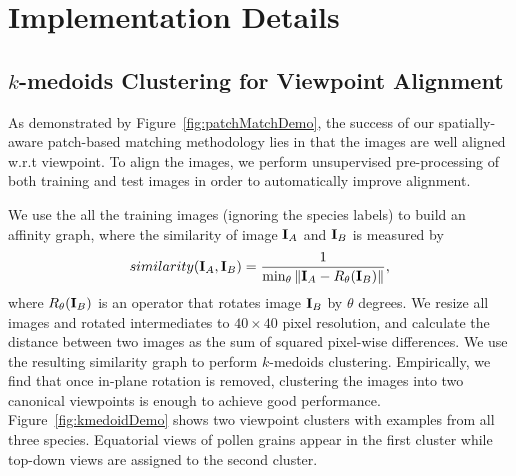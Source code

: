 \documentclass[10pt,twocolumn,letterpaper]{article}
\def\A{{\bf A}}
\def\I{{\bf I}}
\def\W{{\bf W}}
\begin{document}



\section{Implementation Details}

\subsection{$k$-medoids Clustering for Viewpoint Alignment}
As demonstrated by Figure~\ref{fig:patchMatchDemo},
the success of our spatially-aware patch-based matching methodology lies in that the images are well aligned w.r.t viewpoint.
To align the images,
we perform unsupervised pre-processing of both training and test images in order to
automatically improve alignment.

We use the all the training images (ignoring the species labels) to build an
affinity graph, where the similarity of image $\I_A$ and $\I_B$ is measured by
\begin{equation}
similarity(\I_A,\I_B) =  \frac{1}{\min_\theta \Vert \I_A - R_\theta(\I_B)\Vert},
\end{equation}
where $R_\theta(\I_B)$ is an operator that rotates image $\I_B$ by $\theta$ degrees.
We resize all images and rotated intermediates to $40\times40$ pixel resolution,
and calculate the distance between two images as the sum of squared pixel-wise differences.
We use the resulting similarity graph to perform $k$-medoids clustering.
Empirically, we find that once in-plane rotation is removed, clustering the
images into two canonical viewpoints is enough to achieve good performance.
Figure~\ref{fig:kmedoidDemo} shows two viewpoint clusters with examples from
all three species. Equatorial views of pollen grains appear in the first
cluster while top-down views are assigned to the second cluster.
\end{document}
